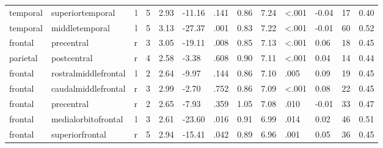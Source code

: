 \documentclass{article}
\begin{document}
\begin{longtable}{llrR{1.3cm}R{1cm}R{1.3cm}R{1cm}R{1cm}R{1.3cm}R{1cm}R{1.8cm}R{1.3cm}R{1.8cm}}
  temporal &          superiortemporal &    l &         5 &                  2.93 &           -11.16 &               .141 &                               0.86 &                          7.24 &                   \textless.001 &  -0.04 &     17 &      0.40 \\
  temporal &            middletemporal &    l &         5 &                  3.13 &           -27.37 &               .001 &                               0.83 &                          7.22 &                   \textless.001 &  -0.01 &     60 &      0.52 \\
   frontal &                precentral &    r &         3 &                  3.05 &           -19.11 &               .008 &                               0.85 &                          7.13 &                   \textless.001 &   0.06 &     18 &      0.45 \\
  parietal &               postcentral &    r &         4 &                  2.58 &            -3.38 &               .608 &                               0.90 &                          7.11 &                   \textless.001 &   0.04 &     14 &      0.44 \\
   frontal &      rostralmiddlefrontal &    l &         2 &                  2.64 &            -9.97 &               .144 &                               0.86 &                          7.10 &                            .005 &   0.09 &     19 &      0.45 \\
   frontal &       caudalmiddlefrontal &    r &         3 &                  2.99 &            -2.70 &               .752 &                               0.86 &                          7.09 &                   \textless.001 &   0.08 &     22 &      0.45 \\
   frontal &                precentral &    r &         2 &                  2.65 &            -7.93 &               .359 &                               1.05 &                          7.08 &                            .010 &  -0.01 &     33 &      0.47 \\
   frontal &       medialorbitofrontal &    l &         3 &                  2.61 &           -23.60 &               .016 &                               0.91 &                          6.99 &                            .014 &   0.02 &     46 &      0.51 \\
   frontal &           superiorfrontal &    r &         5 &                  2.94 &           -15.41 &               .042 &                               0.89 &                          6.96 &                            .001 &   0.05 &     36 &      0.45 \\

\end{longtable}
\end{document}
